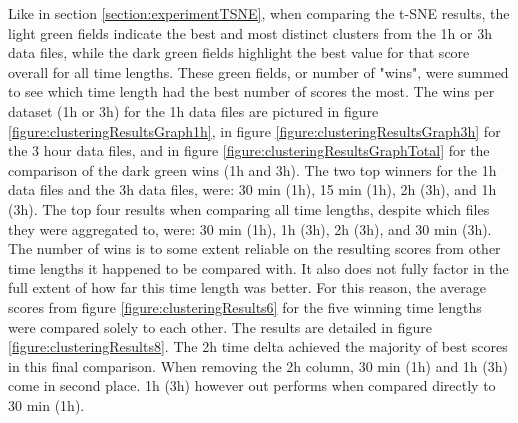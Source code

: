 Like in section \ref{section:experimentTSNE}, when comparing the t-SNE results, the light green fields indicate the best and most distinct clusters from the 1h or 3h data files, while the dark green fields highlight the best value for that score overall for all time lengths. These green fields, or number of "wins", were summed to see which time length had the best number of scores the most. The wins per dataset (1h or 3h) for the 1h data files are pictured in figure \ref{figure:clusteringResultsGraph1h}, in figure \ref{figure:clusteringResultsGraph3h} for the 3 hour data files, and in figure \ref{figure:clusteringResultsGraphTotal} for the comparison of the dark green wins (1h and 3h). The two top winners for the 1h data files and the 3h data files, were: 30 min (1h), 15 min (1h), 2h (3h), and 1h (3h). The top four results when comparing all time lengths, despite which files they were aggregated to, were: 30 min (1h), 1h (3h), 2h (3h), and 30 min (3h). The number of wins is to some extent reliable on the resulting scores from other time lengths it happened to be compared with. It also does not fully factor in the full extent of how far this time length was better. For this reason, the average scores from figure \ref{figure:clusteringResults6} for the five winning time lengths were compared solely to each other. The results are detailed in figure \ref{figure:clusteringResults8}. The 2h time delta achieved the majority of best scores in this final comparison. When removing the 2h column, 30 min (1h) and 1h (3h) come in second place. 1h (3h) however out performs when compared directly to 30 min (1h).







